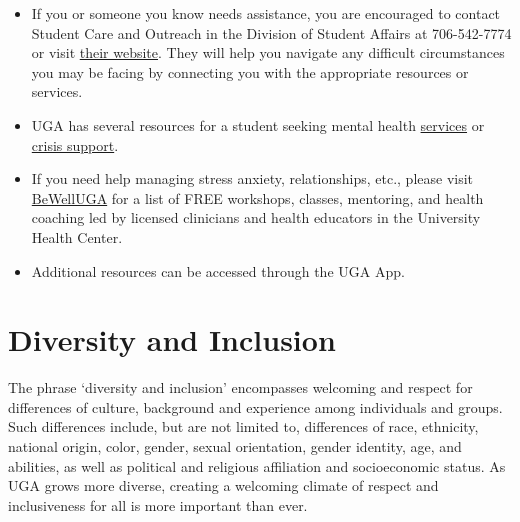 \documentclass[12pt]{article}
\begin{document}
\begin{itemize}
  \setlength\itemsep{-6pt}
  \item If you or someone you know needs assistance, you are
    encouraged to contact Student Care and Outreach in the Division of
    Student Affairs at 706-542-7774 or visit
    \href{https://sco.uga.edu}{their website}. They
    will help you navigate any difficult circumstances you may be facing
    by connecting you with the appropriate resources or services.
  \item UGA has several resources for a student seeking mental health
    \href{https://www.uhs.uga.edu/bewelluga/bewelluga}{services} or
    \href{https://www.uhs.uga.edu/info/emergencies}{crisis support}.
  \item If you need help managing stress anxiety, relationships, etc.,
    please visit \href{https://www.uhs.uga.edu/bewelluga/bewelluga}{BeWellUGA}
    for a list of FREE workshops, classes, mentoring, and health
    coaching led by licensed clinicians and health educators in the
    University Health Center.
  \item Additional resources can be accessed through the UGA App.
\end{itemize}


\vspace{-2mm}
\section*{\normalsize Diversity and Inclusion}
\vspace{-4mm}
The phrase ‘diversity and inclusion’ encompasses welcoming and respect
for differences of culture, background and experience among
individuals and groups. Such differences include, but are not limited
to, differences of race, ethnicity, national origin, color, gender,
sexual orientation, gender identity, age, and abilities, as well as
political and religious affiliation and socioeconomic status. As UGA
grows more diverse, creating a welcoming climate of respect and
inclusiveness for all is more important than ever. 





\end{document}
